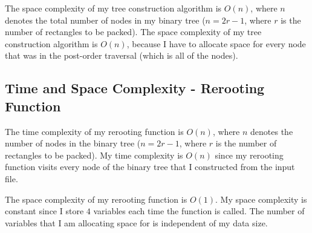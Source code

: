 \documentclass[10pt]{article}
\begin{document}
\noindent \newline The space complexity of my tree construction algorithm is $O(n)$, where $n$ denotes the total number of nodes in my binary tree ($n = 2r - 1$, where $r$ is the number of rectangles to be packed).
The space complexity of my tree construction algorithm is $O(n)$, because I have to allocate space for every node that was in the post-order traversal (which is all of the nodes).

\subsection*{Time and Space Complexity - Rerooting Function}
The time complexity of my rerooting function is $O(n)$, where $n$ denotes the number of nodes in the binary tree ($n = 2r - 1$, where $r$ is the number of rectangles to be packed).
My time complexity is $O(n)$ since my rerooting function visits every node of the binary tree that I constructed from the input file.

\noindent \newline The space complexity of my rerooting function is $O(1)$. My space complexity is constant since I store $4$ variables each time the function is called.
The number of variables that I am allocating space for is independent of my data size.
\end{document}
